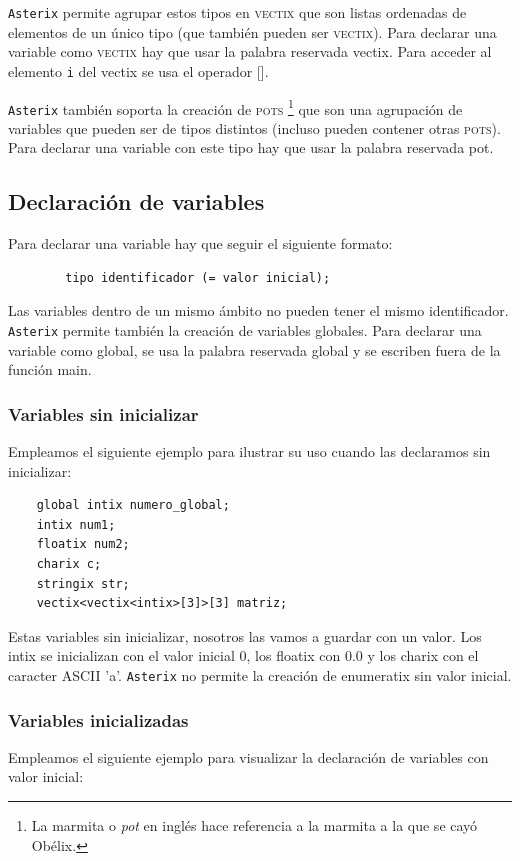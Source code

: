 \documentclass[a4paper, 10pt]{article}
\newcommand{\atx}{\texttt{Asterix} }
\begin{document}
    \atx permite agrupar estos tipos en \textsc{vectix} que son listas ordenadas
    de elementos de un único tipo (que también pueden ser \textsc{vectix}).
    Para declarar una variable como \textsc{vectix} hay que usar la palabra 
    reservada \textsf{vectix}. Para acceder al elemento \texttt{i} del vectix
    se usa el operador [].

    \atx también soporta la creación de \textsc{pots} \footnote{La marmita o
    \textit{pot} en inglés hace referencia a la marmita a la que se cayó
    Obélix.} que son una agrupación de variables que pueden ser de tipos
    distintos (incluso pueden contener otras \textsc{pots}). Para declarar una
    variable con este tipo hay que usar la palabra reservada \textsf{pot}.

    \subsection*{Declaración de variables}
    Para declarar una variable hay que seguir el siguiente formato: 
    \begin{verbatim}
        tipo identificador (= valor inicial);
    \end{verbatim}
    
    Las variables dentro de un mismo ámbito no pueden tener el mismo identificador. 
    \atx permite también la creación de variables globales. Para declarar una variable como 
    global, se usa la palabra reservada \textsf{global} y se escriben fuera de
    la función main. 

    \subsubsection*{Variables sin inicializar}
    Empleamos el siguiente ejemplo para ilustrar su uso cuando
    las declaramos sin inicializar:

    \begin{verbatim}
    global intix numero_global;
    intix num1;
    floatix num2;
    charix c;
    stringix str;
    vectix<vectix<intix>[3]>[3] matriz;
    \end{verbatim}

    Estas variables sin inicializar, nosotros las vamos a guardar con un valor.
    Los intix se inicializan con el valor inicial 0, los floatix con 0.0 y los
    charix con el caracter ASCII 'a'. \atx no permite la creación de enumeratix
    sin valor inicial.
    
    \subsubsection*{Variables inicializadas}
    Empleamos el siguiente ejemplo para visualizar la declaración de variables
    con valor inicial:
\end{document}
